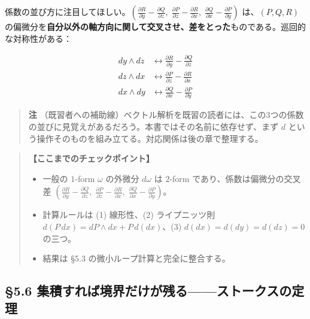 \documentclass[a4paper,12pt,openany]{book}
\begin{document}
係数の並び方に注目してほしい。\((\frac{\partial R}{\partial y} - \frac{\partial Q}{\partial z},\; \frac{\partial P}{\partial z} - \frac{\partial R}{\partial x},\; \frac{\partial Q}{\partial x} - \frac{\partial P}{\partial y})\)
は、\((P, Q, R)\)
の偏微分を\textbf{自分以外の軸方向に関して交叉させ、差をとった}ものである。巡回的な対称性がある：

\[\begin{aligned}
dy \wedge dz &\longleftrightarrow \frac{\partial R}{\partial y} - \frac{\partial Q}{\partial z} \\
dz \wedge dx &\longleftrightarrow \frac{\partial P}{\partial z} - \frac{\partial R}{\partial x} \\
dx \wedge dy &\longleftrightarrow \frac{\partial Q}{\partial x} - \frac{\partial P}{\partial y}
\end{aligned}\]

\begin{quote}
\textbf{注}
（既習者への補助線）ベクトル解析を既習の読者には、この3つの係数の並びに見覚えがあるだろう。本書ではその名前に依存せず、まず
\(d\) という操作そのものを組み立てる。対応関係は後の章で整理する。
\end{quote}

\begin{quote}
\textbf{【ここまでのチェックポイント】}

\begin{itemize}
\item
  一般の \(1\)-form \(\omega\) の外微分 \(d\omega\) は \(2\)-form
  であり、係数は偏微分の交叉差
  \((\frac{\partial R}{\partial y}-\frac{\partial Q}{\partial z},\; \frac{\partial P}{\partial z}-\frac{\partial R}{\partial x},\; \frac{\partial Q}{\partial x}-\frac{\partial P}{\partial y})\)。
\item
  計算ルールは (1) 線形性、(2) ライプニッツ則
  \(d(P\,dx) = dP \wedge dx + P\,d(dx)\)、(3) \(d(dx)=d(dy)=d(dz)=0\)
  の三つ。
\item
  結果は §5.3 の微小ループ計算と完全に整合する。
\end{itemize}
\end{quote}

\par\vspace{0.35em}\par

\hypertarget{ux96c6ux7a4dux3059ux308cux3070ux5883ux754cux3060ux3051ux304cux6b8bux308bux30b9ux30c8ux30fcux30afux30b9ux306eux5b9aux7406}{%
\subsection{§5.6
集積すれば境界だけが残る——ストークスの定理}\label{ux96c6ux7a4dux3059ux308cux3070ux5883ux754cux3060ux3051ux304cux6b8bux308bux30b9ux30c8ux30fcux30afux30b9ux306eux5b9aux7406}}
\end{document}
